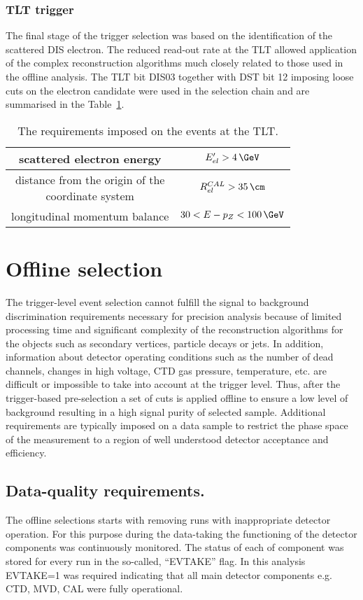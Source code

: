 \subsubsection{TLT trigger}
\label{subsec:tltcuts}
The final stage of the trigger selection was based on the identification of the scattered DIS electron. The reduced read-out rate at the TLT allowed application of the complex reconstruction algorithms much closely related to those used in the offline analysis. The TLT bit \textsf{DIS03} together with DST bit 12 imposing loose cuts on the electron candidate were used in the selection chain and are summarised in the Table~\ref{tab:TLTDSTreq}.
\begin{table}[ht!]
\centering
\begin{tabular}{c|c}
\hline scattered electron energy & $E'_{el}>4\,\GeV$ \\ 
\hline \pbox{6cm}{distance from the origin of the \\ coordinate system}  & $R_{el}^{CAL}>35\,\cm$ \\ 
\hline longitudinal momentum balance & $30<E-p_Z<100\,\GeV$\\
\hline 
\end{tabular} 
\caption{The requirements imposed on the events at the TLT.}
\label{tab:TLTDSTreq}
\end{table}

\section{Offline selection}
\label{sec:offlineselect}
The trigger-level event selection cannot fulfill the signal to background discrimination requirements necessary for precision analysis because of limited processing time and significant complexity of the reconstruction algorithms for the objects such as secondary vertices, particle decays or jets. In addition, information about detector operating conditions such as the number of dead channels, changes in high voltage, CTD gas pressure, temperature, etc. are difficult or impossible to take into account at the trigger level. Thus, after the trigger-based pre-selection a set of cuts is applied offline to ensure a low level of background resulting in a high signal purity of selected sample. Additional requirements are typically imposed on a data sample to restrict the phase space of the measurement to a region of well understood detector acceptance and efficiency.

\subsection{Data-quality requirements.}
The offline selections starts with removing runs with inappropriate detector operation. For this purpose during the data-taking the functioning of the detector components was continuously monitored. The status of each of component was stored for every run in the so-called, ``EVTAKE'' flag. In this analysis EVTAKE=1 was required indicating that all main detector components e.g. CTD, MVD, CAL were fully operational.

